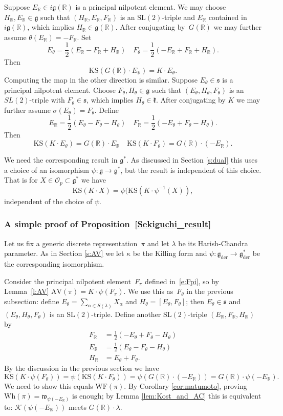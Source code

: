\documentclass[cupthm]{CUP-JNL-JMJ}
\numberwithin{equation}{section}
\theoremstyle{cupplain}
\theoremstyle{cupdefinition}
\theoremstyle{cupremark}
\theoremstyle{cupproof}
\renewcommand{\O}{\mathcal O}
\newcommand{\R}{\mathbb R}
\newcommand{\K}{\mathcal K}
\renewcommand{\k}{\mathfrak k}
\newcommand{\g}{\mathfrak g}
\newcommand{\gder}{\mathfrak g_{\mathrm{der}}}
\newcommand\inv{^{-1}}
\newcommand{\s}{\mathfrak s}
\newcommand{\w}{\mathfrak w}
\newcommand{\AV}{\mathrm{AV}}
\newcommand{\KS}{\mathrm{KS}}
\newcommand{\Wh}{\mathrm{Wh}}
\newcommand{\WF}{\mathrm{WF}}
\begin{document}
Suppose $E_\R\in i\g(\R)$ is a principal nilpotent element.
We may choose $H_\R, E_\R \in \g$ such that $(H_\R,E_\R,F_\R)$ is an $\mathrm{SL}(2)$-triple and  $E_\R$  contained in $i\g(\R)$,
which implies $H_\R\in \g(\R)$. 
After conjugating by~$G(\R)$ we may further assume $\theta(E_\R)=-F_\R$. Set 
\[   E_\theta=\frac12(E_\R-F_\R+H_\R)\quad
F_\theta=\frac12(-E_\R+F_\R+H_\R).
\]
Then
$$
\KS(G(\R)\cdot E_\R)=K\cdot E_\theta.
$$
Computing the map in the other direction is similar. Suppose $E_\theta\in \s$ is a principal nilpotent element. 
Choose $F_\theta, H_\theta \in \g$ such that $(E_\theta, H_\theta, F_\theta)$ is an $SL(2)$-triple with $F_\theta \in \s$,  which implies $H_\theta\in\k$. After conjugating by $K$ we may further assume $\sigma(E_\theta)=F_\theta$.
Define 
\begin{equation}\label{def_F_R}
E_\R=\frac12(E_\theta-F_\theta-H_\theta)\quad
F_\R=\frac12(-E_\theta+F_\theta-H_\theta).
\end{equation}
Then
\begin{equation}
\label{e:KS}
\KS(K\cdot E_\theta)=G(\R)\cdot E_\R\quad\KS(K\cdot F_\theta)=G(\R)\cdot(-E_\R).
\end{equation}

We need the corresponding result in $\g^*$. As discussed in Section \ref{s:dual} this uses a choice of an isomorphism $\psi\colon \g\to \g^*$, but the result is independent of this choice.
That is for $X\in \O_p\subset \g^*$ we have
$$
\KS(K\cdot X)=\psi(\KS(K\cdot \psi\inv(X)),
$$
independent of the choice of $\psi$.


\subsubsection{A simple proof of Proposition~\ref{Sekiguchi_result}}\label{sec:sekiguchi_proof}

Let us fix a generic discrete representation~$\pi$ and let $\lambda$ be its Harish-Chandra parameter.
As in Section \ref{s:AV} we let $\kappa$ be the Killing form and $\psi\colon\gder\to \gder^*$ be the corresponding isomorphism.

Consider the principal nilpotent element~$F_\pi$ defined in~\eqref{e:Fpi}, so by Lemma~\ref{l:AV} $\AV(\pi)=K\cdot \psi(F_\pi)$. 
We use this as~$F_\theta$ in the previous subsection: define $E_\theta = \sum_{\alpha \in S(\lambda)}X_\alpha$ and $H_\theta  = [E_\theta, F_\theta]$; then $E_\theta \in \s$ and $(E_\theta, H_\theta, F_\theta)$ is an $\mathrm{SL}(2)$-triple. Define another $\mathrm{SL}(2)$-triple $(E_\R, F_\R, H_\R)$ by
\[ \begin{aligned}
  F_\R&=\frac12(-E_\theta+F_\theta-H_\theta)\\
  E_\R&=\frac12(E_\theta-F_\theta-H_\theta)\\
  H_\R&=E_\theta+F_\theta.
\end{aligned}\]
By the discussion in the previous section we have 
$$\KS(K\cdot \psi(F_\theta))=\psi(\KS(K\cdot F_\theta))=\psi(G(\R)\cdot (-E_\R))=G(\R)\cdot \psi(-E_\R).$$
We need to show this equals $\WF(\pi)$. By Corollary \ref{cor:matumoto}, proving $\Wh(\pi)=\w_{\psi(-E_
  \R)}$ is enough; by 
   Lemma \ref{lem:Kost_and_AC} this is equivalent to: $\K(\psi(-E_\R))$ meets $G(\R)\cdot\lambda$. 
\end{document}
